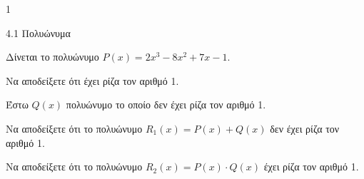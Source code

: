 \begin{ylh}{1}
\item 4.1 Πολυώνυμα
\end{ylh}
Δίνεται το πολυώνυμο $P(x) = 2x^3 - 8x^2 + 7x - 1$.
\begin{alist}
\item Να αποδείξετε ότι έχει ρίζα τον αριθμό 1.
\item Έστω $Q(x)$ πολυώνυμο το οποίο δεν έχει ρίζα τον αριθμό 1.
\end{alist}
\begin{alist}
\item
  Να αποδείξετε ότι το πολυώνυμο $R_1(x) = P(x) + Q(x)$ δεν έχει ρίζα τον αριθμό 1.
\end{alist}
\begin{alist}
\item
  Να αποδείξετε ότι το πολυώνυμο $R_2(x) = P(x) \cdot Q(x)$ έχει ρίζα τον αριθμό 1.
\end{alist}

